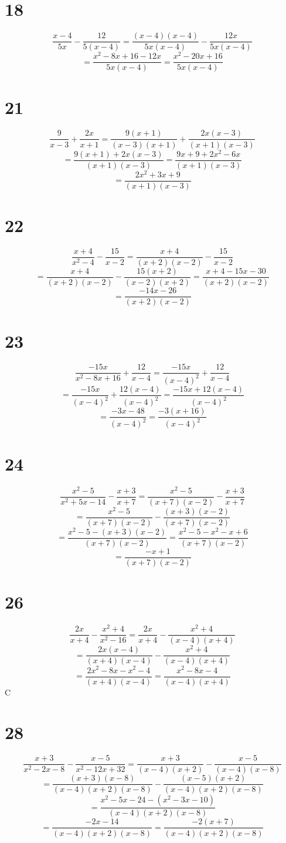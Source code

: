 \documentclass{article}
\theoremstyle{definition}
\newcommand{\?}{\stackrel{?}{=}}
\begin{document}
\section*{18}
\[ \dfrac{x-4}{5x}-\dfrac{12}{5(x-4)}=\dfrac{(x-4)(x-4)}{5x(x-4)}-\dfrac{12x}{5x(x-4)} \]
\[ =\dfrac{x^2-8x+16-12x}{5x(x-4)}=\dfrac{x^2-20x+16}{5x(x-4)} \]

\section*{21}
\[ \dfrac{9}{x-3}+\dfrac{2x}{x+1}=\dfrac{9(x+1)}{(x-3)(x+1)}+\dfrac{2x(x-3)}{(x+1)(x-3)} \]
\[ =\dfrac{9(x+1)+2x(x-3)}{(x+1)(x-3)}=\dfrac{9x+9+2x^2-6x}{(x+1)(x-3)} \]
\[ =\dfrac{2x^2+3x+9}{(x+1)(x-3)} \]

\section*{22}
\[ \dfrac{x+4}{x^2-4}-\dfrac{15}{x-2}=\dfrac{x+4}{(x+2)(x-2)}-\dfrac{15}{x-2} \]
\[ =\dfrac{x+4}{(x+2)(x-2)}-\dfrac{15(x+2)}{(x-2)(x+2)}=\dfrac{x+4-15x-30}{(x+2)(x-2)} \]
\[ =\dfrac{-14x-26}{(x+2)(x-2)} \]

\section*{23}
\[ \dfrac{-15x}{x^2-8x+16}+\dfrac{12}{x-4}=\dfrac{-15x}{(x-4)^2}+\dfrac{12}{x-4} \]
\[ =\dfrac{-15x}{(x-4)^2}+\dfrac{12(x-4)}{(x-4)^2}=\dfrac{-15x+12(x-4)}{(x-4)^2} \]
\[ =\dfrac{-3x-48}{(x-4)^2}=\dfrac{-3(x+16)}{(x-4)^2} \]

\section*{24}
\[ \dfrac{x^2-5}{x^2+5x-14}-\dfrac{x+3}{x+7}=\dfrac{x^2-5}{(x+7)(x-2)}-\dfrac{x+3}{x+7} \]
\[ =\dfrac{x^2-5}{(x+7)(x-2)}-\dfrac{(x+3)(x-2)}{(x+7)(x-2)} \]
\[ =\dfrac{x^2-5-(x+3)(x-2)}{(x+7)(x-2)}=\dfrac{x^2-5-x^2-x+6}{(x+7)(x-2)} \]
\[ =\dfrac{-x+1}{(x+7)(x-2)} \]

\section*{26}
\[ \dfrac{2x}{x+4}-\dfrac{x^2+4}{x^2-16}=\dfrac{2x}{x+4}-\dfrac{x^2+4}{(x-4)(x+4)} \]
\[ =\dfrac{2x(x-4)}{(x+4)(x-4)}-\dfrac{x^2+4}{(x-4)(x+4)} \]
\[ =\dfrac{2x^2-8x-x^2-4}{(x+4)(x-4)}=\dfrac{x^2-8x-4}{(x-4)(x+4)} \]
C

\section*{28}
\[ \dfrac{x+3}{x^2-2x-8}-\dfrac{x-5}{x^2-12x+32}=\dfrac{x+3}{(x-4)(x+2)}-\dfrac{x-5}{(x-4)(x-8)} \]
\[ =\dfrac{(x+3)(x-8)}{(x-4)(x+2)(x-8)}-\dfrac{(x-5)(x+2)}{(x-4)(x+2)(x-8)} \]
\[ =\dfrac{x^2-5x-24-(x^2-3x-10)}{(x-4)(x+2)(x-8)} \]
\[ =\dfrac{-2x-14}{(x-4)(x+2)(x-8)}=\dfrac{-2(x+7)}{(x-4)(x+2)(x-8)} \]
\end{document}
